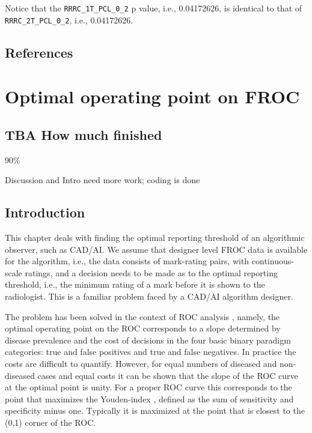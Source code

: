 \documentclass[
]{book}
\begin{document}
Notice that the \texttt{RRRC\_1T\_PCL\_0\_2} p value, i.e., 0.04172626, is identical to that of \texttt{RRRC\_2T\_PCL\_0\_2}, i.e., 0.04172626.

\hypertarget{standalone-cad-radiologists-references}{%
\section{References}\label{standalone-cad-radiologists-references}}

\hypertarget{optim-op-point}{%
\chapter{Optimal operating point on FROC}\label{optim-op-point}}

\hypertarget{optim-op-point-how-much-finished}{%
\section{TBA How much finished}\label{optim-op-point-how-much-finished}}

90\%

Discussion and Intro need more work; coding is done

\hypertarget{optim-op-point-intro}{%
\section{Introduction}\label{optim-op-point-intro}}

This chapter deals with finding the optimal reporting threshold of an algorithmic observer, such as CAD/AI. We assume that designer level FROC data is available for the algorithm, i.e., the data consists of mark-rating pairs, with continuous-scale ratings, and a decision needs to be made as to the optimal reporting threshold, i.e., the minimum rating of a mark before it is shown to the radiologist. This is a familiar problem faced by a CAD/AI algorithm designer.

The problem has been solved in the context of ROC analysis \citep{metz1978rocmethodology}, namely, the optimal operating point on the ROC corresponds to a slope determined by disease prevalence and the cost of decisions in the four basic binary paradigm categories: true and false positives and true and false negatives. In practice the costs are difficult to quantify. However, for equal numbers of diseased and non-diseased cases and equal costs it can be shown that the slope of the ROC curve at the optimal point is unity. For a proper ROC curve this corresponds to the point that maximizes the Youden-index \citep{youden1950index}, defined as the sum of sensitivity and specificity minus one. Typically it is maximized at the point that is closest to the (0,1) corner of the ROC.
\end{document}

